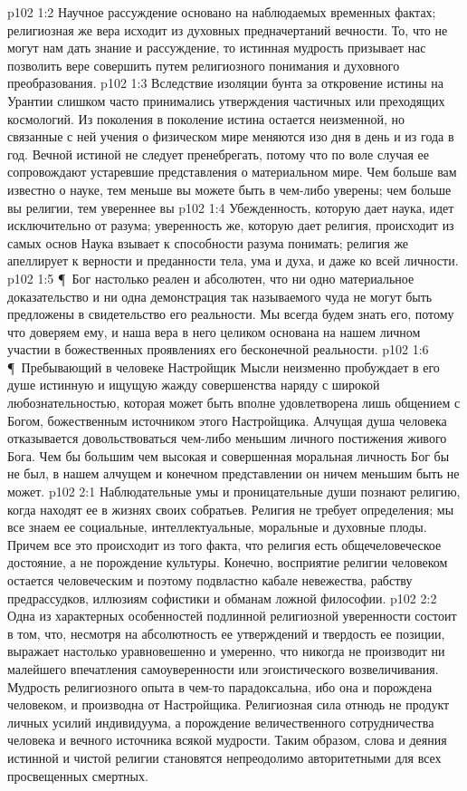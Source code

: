 \vs p102 1:2 Научное рассуждение основано на наблюдаемых временных фактах; религиозная же вера исходит из духовных предначертаний вечности. То, что не могут нам дать знание и рассуждение, то истинная мудрость призывает нас позволить вере совершить путем религиозного понимания и духовного преобразования.
\vs p102 1:3 Вследствие изоляции бунта за откровение истины на Урантии слишком часто принимались утверждения частичных или преходящих космологий. Из поколения в поколение истина остается неизменной, но связанные с ней учения о физическом мире меняются изо дня в день и из года в год. Вечной истиной не следует пренебрегать, потому что по воле случая ее сопровождают устаревшие представления о материальном мире. Чем больше вам известно о науке, тем меньше вы можете быть в чем\hyp{}либо уверены; чем больше  вы религии, тем увереннее вы
\vs p102 1:4 Убежденность, которую дает наука, идет исключительно от разума; уверенность же, которую дает религия, происходит из самых основ  Наука взывает к способности разума понимать; религия же апеллирует к верности и преданности тела, ума и духа, и даже ко всей личности.
\vs p102 1:5 \P\ Бог настолько реален и абсолютен, что ни одно материальное доказательство и ни одна демонстрация так называемого чуда не могут быть предложены в свидетельство его реальности. Мы всегда будем знать его, потому что доверяем ему, и наша вера в него целиком основана на нашем личном участии в божественных проявлениях его бесконечной реальности.
\vs p102 1:6 \P\ Пребывающий в человеке Настройщик Мысли неизменно пробуждает в его душе истинную и ищущую жажду совершенства наряду с широкой любознательностью, которая может быть вполне удовлетворена лишь общением с Богом, божественным источником этого Настройщика. Алчущая душа человека отказывается довольствоваться чем\hyp{}либо меньшим личного постижения живого Бога. Чем бы большим чем высокая и совершенная моральная личность Бог бы не был, в нашем алчущем и конечном представлении он ничем меньшим быть не может.
\vs p102 2:1 Наблюдательные умы и проницательные души познают религию, когда находят ее в жизнях своих собратьев. Религия не требует определения; мы все знаем ее социальные, интеллектуальные, моральные и духовные плоды. Причем все это происходит из того факта, что религия есть общечеловеческое достояние, а не порождение культуры. Конечно, восприятие религии человеком остается человеческим и поэтому подвластно кабале невежества, рабству предрассудков, иллюзиям софистики и обманам ложной философии.
\vs p102 2:2 Одна из характерных особенностей подлинной религиозной уверенности состоит в том, что, несмотря на абсолютность ее утверждений и твердость ее позиции, выражает настолько уравновешенно и умеренно, что никогда не производит ни малейшего впечатления самоуверенности или эгоистического возвеличивания. Мудрость религиозного опыта в чем\hyp{}то парадоксальна, ибо она и порождена человеком, и производна от Настройщика. Религиозная сила отнюдь не продукт личных усилий индивидуума, а порождение величественного сотрудничества человека и вечного источника всякой мудрости. Таким образом, слова и деяния истинной и чистой религии становятся непреодолимо авторитетными для всех просвещенных смертных.
